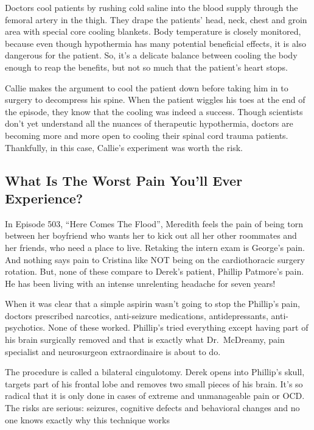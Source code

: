 \documentclass[12pt,a4paper,onecolumn]{article}
\begin{document}
Doctors cool patients by rushing cold saline\cite{saline} into the blood supply through the femoral
artery in the thigh. They drape the patients' head, neck, chest and groin area with special core
cooling blankets. Body temperature is closely monitored, because even though hypothermia has many
potential beneficial effects, it is also dangerous for the patient. So, it's a delicate balance
between cooling the body enough to reap\cite{reap} the benefits, but not so much that the patient's
heart stops.

Callie makes the argument to cool the patient down before taking him in to surgery to decompress his
spine. When the patient wiggles\cite{wiggles} his toes at the end of the episode, they know that the
cooling was indeed a success. Though scientists don't yet understand all the nuances\cite{nuance} of
therapeutic hypothermia, doctors are becoming more and more open to cooling their spinal cord
trauma\cite{trauma} patients. Thankfully, in this case, Callie's experiment was worth the risk.


\subsection{What Is The Worst Pain You'll Ever Experience? }

In Episode 503, ``Here Comes The Flood'', Meredith feels the pain of being torn between her
boyfriend who wants her to kick out all her other roommates and her friends, who need a place to
live. Retaking the intern exam is George's pain. And nothing says pain to Cristina like NOT being on
the cardiothoracic surgery rotation. But, none of these compare to Derek's patient, Phillip
Patmore's pain. He has been living with an intense unrelenting headache for seven years!

When it was clear that a simple aspirin wasn't going to stop the Phillip's pain, doctors prescribed
narcotics\cite{narcotics}, anti-seizure medications, antidepressants, anti-psychotics. None of these
worked. Phillip's tried everything except having part of his brain surgically removed and that is
exactly what Dr.~McDreamy, pain specialist and neurosurgeon extraordinaire is about to do.

The procedure is called a bilateral cingulotomy. Derek opens into Phillip's skull, targets part of
his frontal lobe\cite{lobe} and removes two small pieces of his brain. It's so radical that it is
only done in cases of extreme and unmanageable pain or OCD. The risks are serious: seizures,
cognitive\cite{cognitive} defects and behavioral changes and no one knows exactly why this technique
works
\end{document}
